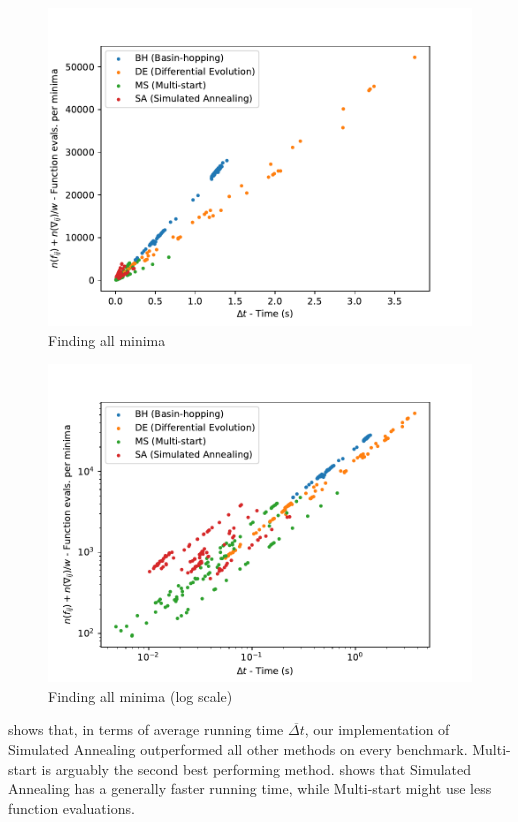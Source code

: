 \begin{figure}
    \center
    \caption{Finding all minima}
    \label{fig:compare1}
    \includegraphics[scale=0.5]{figures/compare1-1.pdf}
\end{figure}

\begin{figure}
    \center
    \caption{Finding all minima (log scale)}
    \label{fig:compare-log}
    \includegraphics[scale=0.5]{figures/compare1-2.pdf}
\end{figure}

 shows that, in terms of average running time $\overline{\Delta t}$,
our implementation of Simulated Annealing outperformed all other methods on every benchmark. Multi-start is arguably
the second best performing method.  shows that Simulated Annealing has a generally faster running time, while Multi-start
might use less function evaluations.

